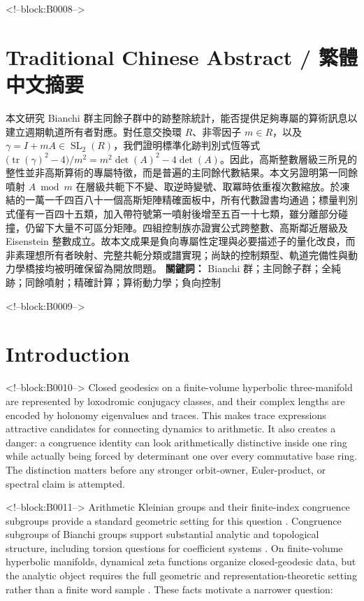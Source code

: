\documentclass[11pt,a4paper]{article}
\theoremstyle{definition}
\theoremstyle{remark}
\newcommand{\SL}{\operatorname{SL}}
\newcommand{\tr}{\operatorname{tr}}
\begin{document}
<!--block:B0008-->
\begin{otherlanguage}{chinese-traditional}
\section*{Traditional Chinese Abstract / 繁體中文摘要}
本文研究 Bianchi 群主同餘子群中的跡整除統計，能否提供足夠專屬的算術訊息以建立週期軌道所有者對應。對任意交換環 \(R\)、非零因子 \(m\in R\)，以及 \(\gamma=I+mA\in\SL_2(R)\)，我們證明標準化跡判別式恆等式 \(\bigl(\tr(\gamma)^2-4\bigr)/m^2=m^2\det(A)^2-4\det(A)\)。因此，高斯整數層級三所見的整性並非高斯算術的專屬特徵，而是普遍的主同餘代數結果。本文另證明第一同餘噴射 \(A\bmod m\) 在層級共軛下不變、取逆時變號、取冪時依重複次數縮放。於凍結的一萬一千四百八十一個高斯矩陣精確面板中，所有代數證書均通過；標量判別式僅有一百四十五類，加入帶符號第一噴射後增至五百一十七類，雖分離部分碰撞，仍留下大量不可區分矩陣。四組控制族亦證實公式跨整數、高斯鄰近層級及 Eisenstein 整數成立。故本文成果是負向專屬性定理與必要描述子的量化改良，而非素理想所有者映射、完整共軛分類或譜實現；尚缺的控制類型、軌道完備性與動力學橋接均被明確保留為開放問題。
\noindent\textbf{關鍵詞：} Bianchi 群；主同餘子群；全純跡；同餘噴射；精確計算；算術動力學；負向控制
\end{otherlanguage}

<!--block:B0009-->
\section{Introduction}

<!--block:B0010-->
Closed geodesics on a finite-volume hyperbolic three-manifold are represented by loxodromic conjugacy classes, and their complex lengths are encoded by holonomy eigenvalues and traces. This makes trace expressions attractive candidates for connecting dynamics to arithmetic. It also creates a danger: a congruence identity can look arithmetically distinctive inside one ring while actually being forced by determinant one over every commutative base ring. The distinction matters before any stronger orbit-owner, Euler-product, or spectral claim is attempted.

<!--block:B0011-->
Arithmetic Kleinian groups and their finite-index congruence subgroups provide a standard geometric setting for this question \citep[Chs.~10--11]{MaclachlanReid2003}.
Congruence subgroups of Bianchi groups support substantial analytic and topological structure, including torsion questions for coefficient systems \citep[Introduction and Sec.~2]{PfaffRaimbault2020}.
On finite-volume hyperbolic manifolds, dynamical zeta functions organize closed-geodesic data, but the analytic object requires the full geometric and representation-theoretic setting rather than a finite word sample \citep[abstract and Secs.~3--5]{Pfaff2015}. These facts motivate a narrower question:
\end{document}
